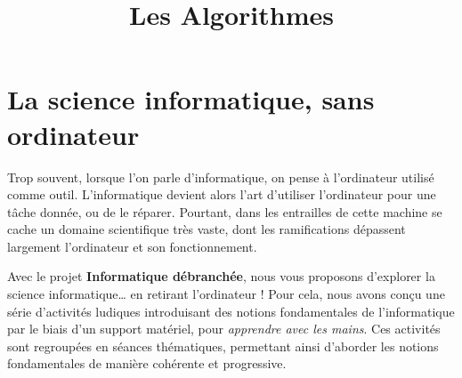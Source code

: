 \documentclass[a5paper,pagesize,DIV=14]{scrbook}
\title{Les Algorithmes}
\date{}
\begin{document}
\maketitle

\chapter*{La science informatique, sans ordinateur}


Trop souvent, lorsque l'on parle d'informatique, on pense à l'ordinateur utilisé comme outil. L'informatique devient alors l'art d'utiliser l'ordinateur pour une tâche donnée, ou de le réparer. Pourtant, dans les entrailles de cette machine se cache un domaine scientifique très vaste, dont les ramifications dépassent largement l'ordinateur et son fonctionnement.

Avec le projet \textbf{Informatique débranchée}, nous vous proposons d'explorer
la science informatique{\ldots} en retirant l'ordinateur ! Pour cela, nous avons conçu une série d'activités ludiques introduisant des notions fondamentales de l'informatique par le biais d'un support matériel, pour \textit{apprendre avec les mains}. Ces activités sont regroupées en séances thématiques, permettant ainsi d'aborder les notions fondamentales de manière cohérente et progressive.
\end{document}
